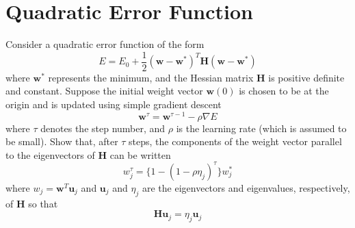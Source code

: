 \section{Quadratic Error Function}

Consider a quadratic error function of the form
\[
E = E_0 + \frac{1}{2} (\mathbf{w} - \mathbf{w}^*)^T \mathbf{H} (\mathbf{w} - \mathbf{w}^*)
\]
where \(\mathbf{w}^*\) represents the minimum, and the Hessian matrix \(\mathbf{H}\) is positive definite and constant. Suppose the initial weight vector \(\mathbf{w}(0)\) is chosen to be at the origin and is updated using simple gradient descent
\[
\mathbf{w}^{\tau} = \mathbf{w}^{\tau-1} - \rho \nabla E
\]
where \(\tau\) denotes the step number, and \(\rho\) is the learning rate (which is assumed to be small). Show that, after \(\tau\) steps, the components of the weight vector parallel to the eigenvectors of \(\mathbf{H}\) can be written
\[
w_j^{\tau} = \{1 - (1 - \rho \eta_j)^{\tau} \} w_j^*
\]
where \(w_j = \mathbf{w}^T \mathbf{u}_j\) and \(\mathbf{u}_j\) and \(\eta_j\) are the eigenvectors and eigenvalues, respectively, of \(\mathbf{H}\) so that
\[
\mathbf{H} \mathbf{u}_j = \eta_j \mathbf{u}_j
\]

